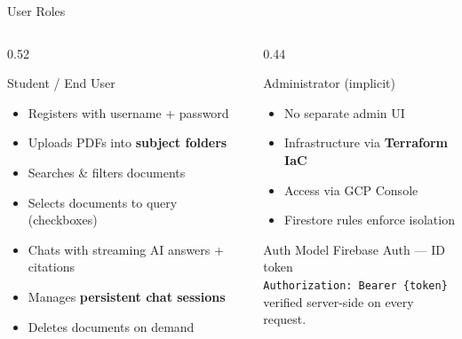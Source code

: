 \documentclass[aspectratio=169]{beamer}
\begin{document}
\begin{frame}[t,shrink=3]{User Roles}
  \begin{columns}[t]
    \begin{column}{0.52\textwidth}
      \begin{block}{Student / End User}
        \begin{itemize}\setlength\itemsep{0.15em}
          \item Registers with username + password
          \item Uploads PDFs into \textbf{subject folders}
          \item Searches \& filters documents
          \item Selects documents to query (checkboxes)
          \item Chats with streaming AI answers + citations
          \item Manages \textbf{persistent chat sessions}
          \item Deletes documents on demand
        \end{itemize}
      \end{block}
    \end{column}
    \begin{column}{0.44\textwidth}
      \begin{block}{Administrator (implicit)}
        \begin{itemize}\setlength\itemsep{0.15em}
          \item No separate admin UI
          \item Infrastructure via \textbf{Terraform IaC}
          \item Access via GCP Console
          \item Firestore rules enforce isolation
        \end{itemize}
      \end{block}
      \vspace{0.25cm}
      \begin{block}{Auth Model}
        {\small Firebase Auth — ID token\\
        \texttt{Authorization: Bearer \{token\}}\\
        verified server-side on every request.}
      \end{block}
    \end{column}
  \end{columns}
\end{frame}
\end{document}
